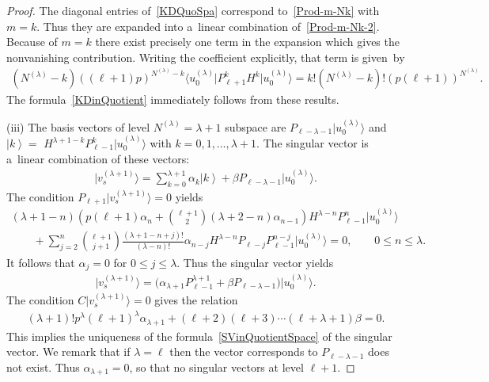 \documentclass[11pt]{article}
\numberwithin{equation}{section}
\def\ket#1{\left| #1\right\rangle}
\begin{document}
\begin{proof}
The diagonal entries of~\eqref{KDQuoSpa} correspond to~\eqref{Prod-m-Nk} with $ m = k$.
Thus they are expanded into a~linear combination of~\eqref{Prod-m-Nk-2}.
Because of $ m = k $ there exist precisely one term in the expansion which gives the nonvanishing contribution.
Writing the coef\/f\/icient explicitly, that term is given~by
\begin{gather*}
(N^{(\lambda)}-k) ((\ell+1) p)^{N^{(\lambda)}-k} \big\langle u_0^{(\lambda)}\big| P_{\ell+1}^k H^k \big|u_0^{(\lambda)}\big\rangle  = k!
(N^{(\lambda)}-k)!   (p  (\ell+1))^{N^{(\lambda)}}.
\end{gather*}
The formula~\eqref{KDinQuotient} immediately follows from these results.

 (iii) The basis vectors of level $ N^{(\lambda)} = \lambda + 1 $ subspace are $ P_{\ell-\lambda-1}
\big|u_0^{(\lambda)}\big\rangle  $ and $ \ket{k} =$ \linebreak  $H^{\lambda+1-k}   P_{\ell-1}^k \big|u_0^{(\lambda)}\big\rangle$ with $
k=0,1,\dots,\lambda+1$.
The singular vector is a~linear combination of these vectors:
\begin{gather*}
\big|v_s^{(\lambda+1)}\big\rangle  = \sum\limits_{k=0}^{\lambda+1} \alpha_k \ket{k} + \beta P_{\ell-\lambda-1}
\big|u_0^{(\lambda)}\big\rangle .
\end{gather*}
The condition $ P_{\ell+1} \big|v_s^{(\lambda+1)}\big\rangle  = 0 $ yields
\begin{gather*}
    (\lambda+1-n) \left(  p (\ell+1)  \alpha_n + \binom{\ell+1}{2} (\lambda+2-n) \alpha_{n-1} \right) H^{\lambda-n}
P_{\ell-1}^n \big|u_0^{(\lambda)}\big\rangle
\\
\qquad{}
+ \sum\limits_{j=2}^n \binom{\ell+1}{j+1} \frac{(\lambda+1-n+j)!}{(\lambda-n)!}   \alpha_{n-j} H^{\lambda-n} P_{\ell-j}
P_{\ell-1}^{n-j} \big|u_0^{(\lambda)}\big\rangle  = 0,
\qquad
0 \leq n \leq \lambda.
\end{gather*}
It follows that $ \alpha_j = 0 $ for $ 0 \leq j \leq \lambda$.
Thus the singular vector yields
\begin{gather*}
\big|v_s^{(\lambda+1)}\big\rangle  = \big(  \alpha_{\lambda+1} P_{\ell-1}^{\lambda+1} + \beta P_{\ell-\lambda-1}  \big)
\big|u_0^{(\lambda)}\big\rangle .
\end{gather*}
The condition $ C \big|v_s^{(\lambda+1)}\big\rangle  = 0 $ gives the relation
\begin{gather*}
(\lambda+1)!  p^{\lambda} (\ell+1)^{\lambda} \alpha_{\lambda+1} + (\ell+2) (\ell+3) \cdots (\ell+\lambda+1) \beta = 0.
\end{gather*}
This implies the uniqueness of the formula~\eqref{SVinQuotientSpace} of the singular vector.
We remark that if $ \lambda=\ell $ then the vector corresponds to $ P_{\ell-\lambda-1} $ does not exist.
Thus $ \alpha_{\lambda+1} = 0 $, so that no singular vectors at level $ \ell+1$.
\end{proof}
\end{document}
